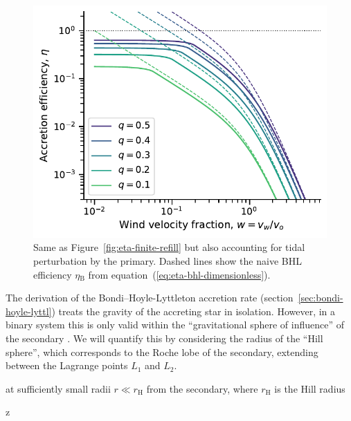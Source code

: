 \documentclass[useAMS, usenatbib, a4paper]{mnras}
\newcommand\Hill{\ensuremath{_{\mathrm{\scriptscriptstyle H}}}}
\newcommand\bhl{\ensuremath{_{\mathrm{\scriptscriptstyle B}}}}
\begin{document}
\begin{figure}
  \centering
  \includegraphics[width=\linewidth]{notebooks/eta-roche-finite-refill}
  \caption{
    Same as Figure~\ref{fig:eta-finite-refill} but
    also accounting for tidal perturbation by the primary. 
    Dashed lines show the naive BHL efficiency \(\eta\bhl\) from
    equation~(\ref{eq:eta-bhl-dimensionless}).
  }
  \label{fig:eta-tidal-perturbation}
\end{figure}




The derivation of the Bondi--Hoyle-Lyttleton accretion rate
(section~\ref{sec:bondi-hoyle-lyttl})
treats the gravity of the accreting star in isolation.
However, in a binary system this is only valid within the
``gravitational sphere of influence'' of the secondary
\citetext{\citealp{Souami:2020a} and references therein}.
We will quantify this by considering the radius of the ``Hill sphere'',
which corresponds to the Roche lobe of the secondary,
extending between the Lagrange points \(L_1\) and \(L_2\).

at sufficiently small radii
\(r \ll r\Hill\) from the secondary, where \(r\Hill\) is the Hill radius

z




\bsp	%
\label{lastpage}
\end{document}
